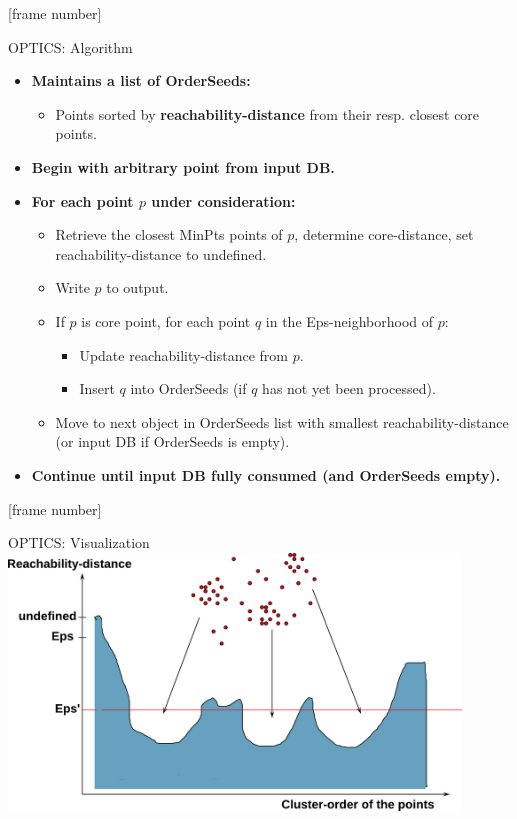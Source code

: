 \documentclass[aspectratio=169,t,xcolor=dvipsnames]{beamer}
\begin{document}
  {
    [frame number]
    \begin{frame}{OPTICS: Algorithm}
      \begin{itemize}
        \item \textbf{Maintains a list of {\color{airforceblue}OrderSeeds}:}
        \begin{itemize}
          \item Points sorted by \textbf{reachability-distance} from their resp. closest core points.
        \end{itemize}
        \item \textbf{Begin with arbitrary point from input DB.}
        \item \textbf{For each point $p$ under consideration:}
        \begin{itemize}
          \item Retrieve the closest MinPts points of $p$, determine core-distance, set reachability-distance to undefined.
          \item Write $p$ to output.
          \item If $p$ is core point, for each point $q$ in the Eps-neighborhood of $p$:
          \begin{itemize}
            \item Update reachability-distance from $p$.
            \item Insert $q$ into OrderSeeds (if $q$ has not yet been processed).
          \end{itemize}
          \item Move to next object in OrderSeeds list with smallest reachability-distance (or input DB if OrderSeeds is empty).
        \end{itemize}
        \item \textbf{Continue until input DB fully consumed (and OrderSeeds empty).}
      \end{itemize}
    \end{frame}
  }

  {
    [frame number]
    \begin{frame}{OPTICS: Visualization}
      \centering
      \includegraphics[width=12cm]{img/clusterdensity.pdf}
    \end{frame}
  }
\end{document}
